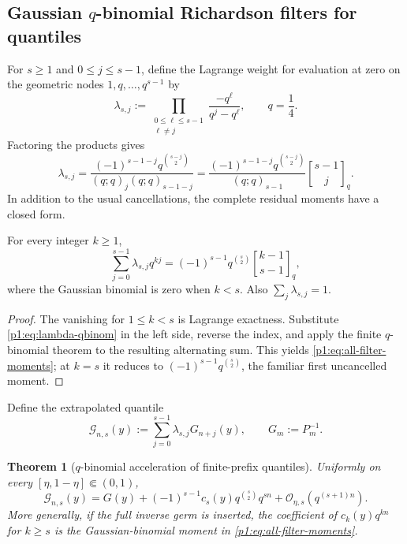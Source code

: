 \documentclass[11pt,oneside]{article}
\numberwithin{equation}{section}
\newtheorem{theorem}{Theorem}[section]
\theoremstyle{definition}
\theoremstyle{remark}
\newcommand{\bigO}{\mathcal O}
\newcommand{\InvF}{G}
\newcommand{\qbinom}[3]{\genfrac{[}{]}{0pt}{}{#1}{#2}_{#3}}
\begin{document}
\subsection{Gaussian \texorpdfstring{$q$}{q}-binomial Richardson filters for quantiles}

For $s\ge1$ and $0\le j\le s-1$, define the Lagrange weight for evaluation at
zero on the geometric nodes $1,q,\ldots,q^{s-1}$ by
\begin{equation}
 \lambda_{s,j}:=
 \prod_{\substack{0\le\ell\le s-1\\\ell\ne j}}
 \frac{-q^\ell}{q^j-q^\ell},
 \qquad q=\frac14.
 \label{p1:eq:lambda-def}
\end{equation}
Factoring the products gives
\begin{equation}
 \boxed{
 \lambda_{s,j}=
 \frac{(-1)^{s-1-j}q^{\binom{s-j}{2}}}
 {(q;q)_j(q;q)_{s-1-j}}
 =\frac{(-1)^{s-1-j}q^{\binom{s-j}{2}}}{(q;q)_{s-1}}
 \qbinom{s-1}{j}{q}.}
 \label{p1:eq:lambda-qbinom}
\end{equation}
In addition to the usual cancellations, the complete residual moments have a closed
form.

\begin{lemma}
\label{p1:lem:filter-moments}
For every integer $k\ge1$,
\begin{equation}
 \boxed{
 \sum_{j=0}^{s-1}\lambda_{s,j}q^{kj}
 =(-1)^{s-1}q^{\binom s2}
 \qbinom{k-1}{s-1}{q},}
 \label{p1:eq:all-filter-moments}
\end{equation}
where the Gaussian binomial is zero when $k<s$.  Also
$\sum_j\lambda_{s,j}=1$.
\end{lemma}

\begin{proof}
The vanishing for $1\le k<s$ is Lagrange exactness.  Substitute
\eqref{p1:eq:lambda-qbinom} in the left side, reverse the index, and apply the finite
$q$-binomial theorem \cite{p1:GasperRahman,p1:AndrewsPartitions} to the resulting alternating sum.  This yields
\eqref{p1:eq:all-filter-moments}; at $k=s$ it reduces to
$(-1)^{s-1}q^{\binom s2}$, the familiar first uncancelled moment.
\end{proof}

Define the extrapolated quantile
\begin{equation}
 \mathcal G_{n,s}(y):=\sum_{j=0}^{s-1}\lambda_{s,j}G_{n+j}(y),
 \qquad G_m:=P_m^{-1}.
 \label{p1:eq:G-richardson}
\end{equation}

\begin{theorem}[$q$-binomial acceleration of finite-prefix quantiles]
\label{p1:thm:quantile-richardson}
Uniformly on every $[\eta,1-\eta]\Subset(0,1)$,
\begin{equation}
 \boxed{
 \mathcal G_{n,s}(y)=\InvF(y)
 +(-1)^{s-1}c_s(y)q^{\binom s2}q^{sn}
 +\bigO_{\eta,s}(q^{(s+1)n}).}
 \label{p1:eq:quantile-richardson}
\end{equation}
More generally, if the full inverse germ is inserted, the coefficient of $c_k(y)q^{kn}$
for $k\ge s$ is the Gaussian-binomial moment in \eqref{p1:eq:all-filter-moments}.
\end{theorem}
\end{document}
